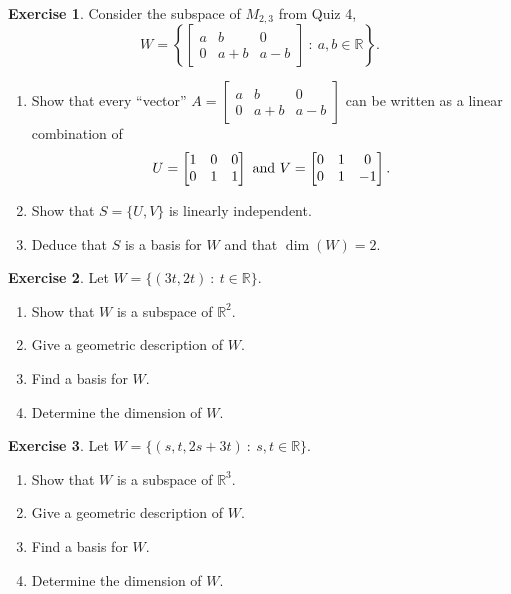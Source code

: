 \documentclass{beamer}
\newcommand{\R}{\mathbb{R}}
\newcommand{\fn}{\insertframenumber}
\theoremstyle{definition}
\newtheorem{exercise}{Exercise}
\begin{document}
\begin{frame}{\fn}
	\begin{exercise}
		Consider the subspace of $M_{2,3}$ from Quiz 4,
			\[W=\left\{\begin{bmatrix} a&b&0\\0&a+b&a-b\end{bmatrix}\ :\ a,b\in\R\right\}.\]
		\begin{enumerate}[label=(\alph*)]
			\item Show that every ``vector'' $A=\begin{bmatrix} a&b&0\\0&a+b&a-b\end{bmatrix}$ can be written as a linear combination of
				\[U=\begin{bmatrix} 1&0&0\\0&1&1\end{bmatrix}\textup{ and }
				V=\begin{bmatrix} 0&1&0\\0&1&-1\end{bmatrix}.\]
			\item Show that $S=\{U,V\}$ is linearly independent.
			\item Deduce that $S$ is a basis for $W$ and that $\dim(W)=2$.
		\end{enumerate}
	\end{exercise}
\end{frame}
\begin{frame}{\fn}
	\begin{exercise}
		Let $W=\{(3t,2t)\ :\ t\in\R\}$.
		\begin{enumerate}[label=(\alph*)]
			\item Show that $W$ is a subspace of $\R^2$.
			\item Give a geometric description of $W$.
			\item Find a basis for $W$.
			\item Determine the dimension of $W$.
		\end{enumerate}
	\end{exercise}
\end{frame}
\begin{frame}{\fn}
\begin{exercise}
	Let $W=\{(s,t,2s+3t)\ :\ s,t\in\R\}$.
	\begin{enumerate}[label=(\alph*)]
		\item Show that $W$ is a subspace of $\R^3$.
		\item Give a geometric description of $W$.
		\item Find a basis for $W$.
		\item Determine the dimension of $W$.
	\end{enumerate}
\end{exercise}
\end{frame}
\end{document}
